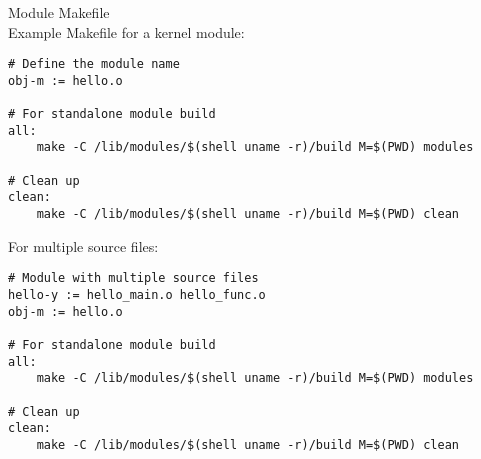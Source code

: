 \begin{code}{Module Makefile}\\
    Example Makefile for a kernel module:
    
\begin{lstlisting}[style=basesmol]
# Define the module name
obj-m := hello.o

# For standalone module build
all:
	make -C /lib/modules/$(shell uname -r)/build M=$(PWD) modules

# Clean up
clean:
	make -C /lib/modules/$(shell uname -r)/build M=$(PWD) clean
\end{lstlisting}

    For multiple source files:
    
\begin{lstlisting}[style=basesmol]
# Module with multiple source files
hello-y := hello_main.o hello_func.o
obj-m := hello.o

# For standalone module build
all:
	make -C /lib/modules/$(shell uname -r)/build M=$(PWD) modules

# Clean up
clean:
	make -C /lib/modules/$(shell uname -r)/build M=$(PWD) clean
\end{lstlisting}
\end{code}

